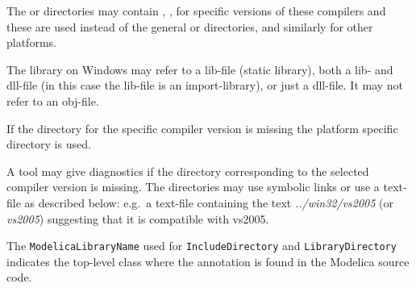 The  or  directories may contain , , 
for specific versions of these compilers and these are used instead of
the general  or  directories, and similarly for other
platforms.

The library on Windows may refer to a lib-file (static library), both a lib- and dll-file (in this case the lib-file is an import-library),
or just a dll-file. It may not refer to an obj-file.

If the directory for the specific compiler version is missing the
platform specific directory is used.

\begin{nonnormative}
A tool may give diagnostics if the directory corresponding to the selected compiler version is missing.  The directories may use symbolic links or use
a text-file as described below: e.g.\ a text-file  containing the text \emph{../win32/vs2005} (or \emph{vs2005}) suggesting that it is
compatible with vs2005.
\end{nonnormative}

The \lstinline!ModelicaLibraryName! used for \lstinline!IncludeDirectory! and \lstinline!LibraryDirectory!
indicates the top-level class where the annotation is found in the
Modelica source code.

